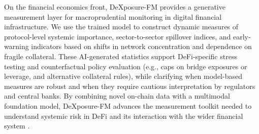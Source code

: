 On the financial economics front, DeXposure-FM provides a generative measurement layer for macroprudential monitoring in digital financial infrastructure. We use the trained model to construct dynamic measures of protocol-level systemic importance, sector-to-sector spillover indices, and early-warning indicators based on shifts in network concentration and dependence on fragile collateral. These AI-generated statistics support DeFi-specific stress testing and counterfactual policy evaluation (e.g., caps on bridge exposures or leverage, and alternative collateral rules), while clarifying when model-based measures are robust and when they require cautious interpretation by regulators and central banks. %
By combining novel on-chain data with a multimodal foundation model, DeXposure-FM advances the measurement toolkit needed to understand systemic risk in DeFi and its interaction with the wider financial system \cite{naifar2025mapping,aufiero2025mapping}.